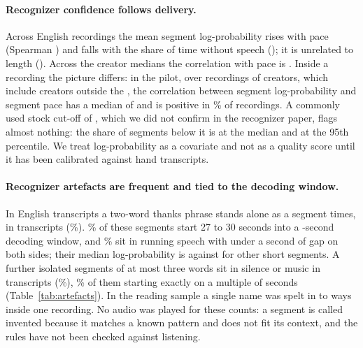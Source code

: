 \documentclass[letterpaper]{article} %
\begin{document}
\paragraph{Recognizer confidence follows delivery.} Across \RhoN{} English recordings the mean segment log-probability rises with pace (Spearman \RhoLogpPace) and falls with the share of time without speech (\RhoLogpNonSp); it is unrelated to length (\RhoLogpLen). Across the \SnapCreatorsFivePlus{} creator medians the correlation with pace is \RhoCreatorLogpPace. Inside a recording the picture differs: in the pilot, over \RhoWithinRecordings{} recordings of \RhoWithinCreators{} creators, which include creators outside the \SnapCreatorsFivePlus, the correlation between segment log-probability and segment pace has a median of \RhoWithinMed{} and is positive in \RhoWithinPositivePct\% of recordings. A commonly used stock cut-off of \StockLogpCutoff, which we did not confirm in the recognizer paper, flags almost nothing: the share of segments below it is \ShareBelowCutoffMed{} at the median and \ShareBelowCutoffPninetyfive{} at the 95th percentile. We treat log-probability as a covariate and not as a quality score until it has been calibrated against hand transcripts.



\paragraph{Recognizer artefacts are frequent and tied to the decoding window.} In \ArtEnglishBase{} English transcripts a two-word thanks phrase stands alone as a segment \ThanksSegments{} times, in \ThanksTranscripts{} transcripts (\ThanksPct\%). \ThanksLateWindowPct\% of these segments start 27 to 30 seconds into a \WindowSeconds-second decoding window, and \ThanksEmbeddedPct\% sit in running speech with under a second of gap on both sides; their median log-probability is \ThanksLogp{} against \OtherShortLogp{} for other short segments. A further \IsoSegments{} isolated segments of at most three words sit in silence or music in \IsoTranscripts{} transcripts (\IsoPct\%), \IsoGridPct\% of them starting exactly on a multiple of \WindowSeconds{} seconds (Table~\ref{tab:artefacts}). In the reading sample a single name was spelt in \SpellingsMin{} to \SpellingsMax{} ways inside one recording. No audio was played for these counts: a segment is called invented because it matches a known pattern and does not fit its context, and the rules have not been checked against listening.
\end{document}
